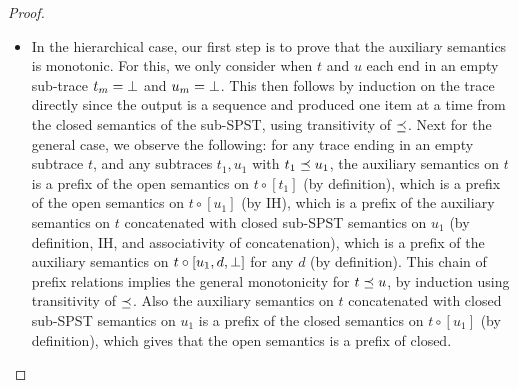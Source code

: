 \begin{proof}
\begin{itemize}
  \item
  In the hierarchical case,
  our first step is to prove that the auxiliary semantics
  is monotonic.
  For this, we only consider when $t$ and $u$ each end in an empty sub-trace
  $t_m = \bot$ and $u_m = \bot$.
  This then follows by induction on the trace directly
  since the output is a sequence and produced one item at a time
  from the closed semantics of the sub-SPST,
  using transitivity of $\preceq$.
  Next for the general case,
  we observe the following:
  for any trace ending in an empty subtrace $t$,
  and any subtraces $t_1, u_1$ with $t_1 \preceq u_1$,
  the auxiliary semantics on $t$
  is a prefix of the open semantics on $t \circ [t_1]$
  (by definition),
  which is a prefix of the open semantics on $t \circ [u_1]$
  (by IH),
  which is a prefix of the auxiliary semantics on $t$
  concatenated with closed sub-SPST semantics on $u_1$
  (by definition, IH, and associativity of concatenation),
  which is a prefix of the auxiliary semantics
  on $t \circ [u_1, d, \bot{}]$ for any $d$
  (by definition).
  This chain of prefix relations
  implies the general monotonicity for $t \preceq u$,
  by induction using transitivity of $\preceq$.
  Also the auxiliary semantics on $t$ concatenated with closed sub-SPST
  semantics on $u_1$ is a prefix of
  the closed semantics on $t \circ [u_1]$
  (by definition),
  which gives that the open semantics is a prefix of closed.


\end{itemize}
\end{proof}
